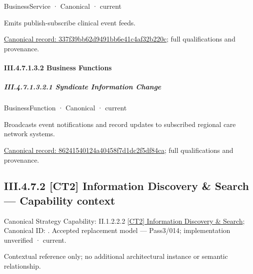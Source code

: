 \label{element:337f39bb62d9491bb6e41c4af32b220c}
{\small BusinessService · Canonical · current}\par

Emits publish-subscribe clinical event feeds.


{\footnotesize \href{../../../../../../../../continuum/business/business-service/337f39bb62d9491bb6e41c4af32b220c.md}{Canonical record: 337f39bb62d9491bb6e41c4af32b220c}; full qualifications and provenance.}\par
\paragraph*{III.4.7.1.3.2 Business Functions}
\label{navigation:III.4.7.1.3.2}

\subparagraph*{III.4.7.1.3.2.1 Syndicate Information Change}
\label{navigation:III.4.7.1.3.2.1}

\label{element:86241540124a40458f7d1dc2f5df84ca}
{\small BusinessFunction · Canonical · current}\par

Broadcasts event notifications and record updates to subscribed regional care network systems.


{\footnotesize \href{../../../../../../../../continuum/business/business-function/86241540124a40458f7d1dc2f5df84ca.md}{Canonical record: 86241540124a40458f7d1dc2f5df84ca}; full qualifications and provenance.}\par
\subsection*{III.4.7.2 [CT2] Information Discovery \& Search — Capability context}
\label{navigation:III.4.7.2}

{\small Canonical Strategy Capability: II.1.2.2.2 \hyperref[element:6621b9a124d7444aa83793810531c388]{[CT2] Information Discovery \& Search}; Canonical ID: \texttt{}. Accepted replacement model — Pass3/014; implementation unverified · current.}\par
Contextual reference only; no additional architectural instance or semantic relationship.\par

